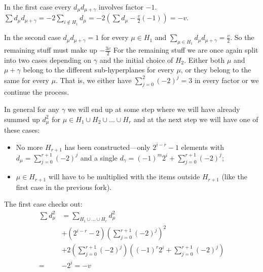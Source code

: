         In the first case every $d_\mu d_{\mu+\gamma}$ involves factor $-1$. $\sum d_\mu d_{\mu+\gamma} = -2\sum\limits_{i\notin H_1} d_\mu = -2 (\sum d_\mu - \frac v2 (-1)) = -v$.
        
        In the second case $d_\mu d_{\mu+\gamma} = 1$ for every $\mu \in H_1$ and $\sum\limits_{\mu \in H_1} d_\mu d_{\mu+\gamma} = \frac v2$. So the remaining stuff must make up $-\frac {3v}2$ For the remaining stuff we are once again split into two cases depending on $\gamma$ and the initial choice of $H_2$. Either both $\mu$ and $\mu+\gamma$ belong to the different sub-hyperplanes for every $\mu$, or they belong to the same for every $\mu$. That is, we either have $\sum\limits_{j=0}^2 (-2)^j = 3$ in every factor or we continue the process.
        
        In general for any $\gamma$ we will end up at some step where we will have already summed up $d_\mu^2$ for $\mu \in H_1 \cup H_2 \cup \ldots \cup H_r$ and at the next step we will have one of these cases:
        
        \begin{itemize}
            \item No more $H_{r+1}$ has been constructed---only $2^{i-r}-1$ elements with $d_\mu = \sum\limits_{j=0}^{r+1} (-2)^j$ and a single $d_\gamma = (-1)^m 2^i + \sum\limits_{j=0}^{r+1} (-2)^j$;
            \item $\mu \in H_{r+1}$ will have to be multiplied with the items outside $H_{r+1}$ (like the first case in the previous fork).
        \end{itemize}

        The first case checks out:
        \begin{equation}
            \begin{split}
                \sum d_\mu^2 & 
                = \sum\limits_{H_1 \cup \ldots \cup H_r} d_\mu^2 \\
                & + (2^{i-r}-2) \left(\sum\limits_{j=0}^{r+1} (-2)^j \right)^2 \\
                & + 2 \left(\sum\limits_{j=0}^{r+1} (-2)^j \right) \left( (-1)^r 2^i + \sum\limits_{j=0}^{r+1} (-2)^j \right) \\
                = & - 2^i = -v
            \end{split}
        \end{equation}
    
